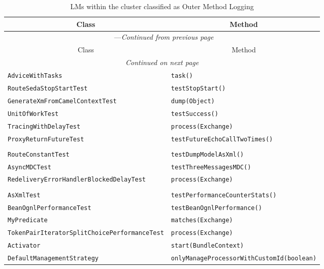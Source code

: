 \begin{center}
\begin{longtable}{ll}
\caption{LMs within the cluster classified as Outer Method Logging}\\
\toprule\multicolumn{1}{c}{Class}&\multicolumn{1}{c}{Method}\\\midrule
\endfirsthead

\multicolumn{2}{c}{\tablename\ \thetable{}---\textit{Continued from previous page}} \\\midrule
\multicolumn{1}{c}{Class}&\multicolumn{1}{c}{Method}\\\midrule
\endhead
\multicolumn{2}{c}{\textit{Continued on next page}}\\\midrule
\endfoot
\bottomrule
\endlastfoot

\lstinline/AdviceWithTasks/&{\lstinline/task()/}\\
\lstinline/RouteSedaStopStartTest/&{\lstinline/testStopStart()/}\\
\lstinline/GenerateXmFromCamelContextTest/&{\lstinline/dump(Object)/}\\
\lstinline/UnitOfWorkTest/&{\lstinline/testSuccess()/}\\
\lstinline/TracingWithDelayTest/&{\lstinline/process(Exchange)/}\\
\lstinline/ProxyReturnFutureTest/&{\lstinline/testFutureEchoCallTwoTimes()/}\\
\raisebox{-13pt}{\shortstack{\lstinline/DumpModelAsXmlTransform/-\\\lstinline/RouteConstantTest/}}&{\lstinline/testDumpModelAsXml()/}\\
\lstinline/AsyncMDCTest/&{\lstinline/testThreeMessagesMDC()/}\\
\lstinline/RedeliveryErrorHandlerBlockedDelayTest/&{\lstinline/process(Exchange)/}\\
\raisebox{-13pt}{\shortstack{\lstinline/ManagedCamelContextDumpStats/-\\\lstinline/AsXmlTest/}}&{\lstinline/testPerformanceCounterStats()/}\\
\lstinline/BeanOgnlPerformanceTest/&{\lstinline/testBeanOgnlPerformance()/}\\
\lstinline/MyPredicate/&{\lstinline/matches(Exchange)/}\\
\lstinline/TokenPairIteratorSplitChoicePerformanceTest/&{\lstinline/process(Exchange)/}\\
\lstinline/Activator/&{\lstinline/start(BundleContext)/}\\
\lstinline/DefaultManagementStrategy/&{\lstinline/onlyManageProcessorWithCustomId(boolean)/}\\

\end{longtable}
\end{center}
